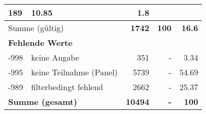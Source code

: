 \begin{longtable}{lXrrr}
       \num{189} &
       \num[round-mode=places,round-precision=2]{10,85} &
         \num[round-mode=places,round-precision=2]{1,8} \\
     \midrule
     \multicolumn{2}{l}{Summe (gültig)} &
       \textbf{\num{1742}} &
     \textbf{100} &
       \textbf{\num[round-mode=places,round-precision=2]{16,6}} \\
     \multicolumn{5}{l}{\textbf{Fehlende Werte}}\\
       -998 &
       keine Angabe &
         \num{351} &
        - &
         \num[round-mode=places,round-precision=2]{3,34} \\
       -995 &
       keine Teilnahme (Panel) &
         \num{5739} &
        - &
         \num[round-mode=places,round-precision=2]{54,69} \\
       -989 &
       filterbedingt fehlend &
         \num{2662} &
        - &
         \num[round-mode=places,round-precision=2]{25,37} \\
     \midrule
     \multicolumn{2}{l}{\textbf{Summe (gesamt)}} &
          \textbf{\num{10494}} &
        \textbf{-} &
        \textbf{100} \\
     \bottomrule
     \end{longtable}
     
